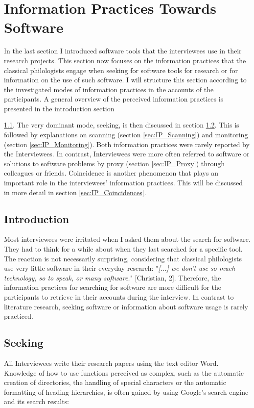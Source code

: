\documentclass[12pt, a4paper, titlepage, oneside, abstract=true, toc=listof, toc=bibliography]{scrreprt}
\begin{document}
\section{Information Practices Towards Software}
\label{sec:IP_SW}
In the last section I introduced software tools that the interviewees use in their research projects. This section now focuses on the information practices that the classical philologists engage when seeking for software tools for research or for information on the use of such software. I will structure this section according to the investigated modes of information practices in the accounts of the participants. A general overview of the perceived information practices is presented in the introduction section {\ref{sec:IP_Introduction}. The very dominant mode, seeking, is then discussed in section \ref{sec:IP_Seeking}. This is followed by explanations on scanning (section \ref{sec:IP_Scanning}) and monitoring (section \ref{sec:IP_Monitoring}). Both information practices were rarely reported by the Interviewees. In contrast, Interviewees were more often referred to software or solutions to software problems by proxy (section \ref{sec:IP_Proxy}) through colleagues or friends. Coincidence is another phenomenon that plays an important role in the interviewees' information practices. This will be discussed in more detail in section \ref{sec:IP_Coincidences}.

\subsection{Introduction}
\label{sec:IP_Introduction}
Most interviewees were irritated when I asked them about the search for software. They had to think for a while about when they last searched for a specific tool. The reaction is not necessarily surprising, considering that classical philologists use very little software in their everyday research: "\textit{[...] we don't use so much technology, so to speak, or many software.}" [Christian, 2]. Therefore, the information practices for searching for software are more difficult for the participants to retrieve in their accounts during the interview. In contrast to literature research, seeking software or information about software usage is rarely practiced. 

\subsection{Seeking}
\label{sec:IP_Seeking}
All Interviewees write their research papers using the text editor Word. Knowledge of how to use functions perceived as complex, such as the automatic creation of directories, the handling of special characters or the automatic formatting of heading hierarchies, is often gained by using Google's search engine and its search results:

}
\end{document}
